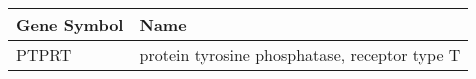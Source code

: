 \begin{tabular}{ll}
\toprule
Gene Symbol &                                          Name \\
\midrule
      PTPRT & protein tyrosine phosphatase, receptor type T \\
\bottomrule
\end{tabular}

